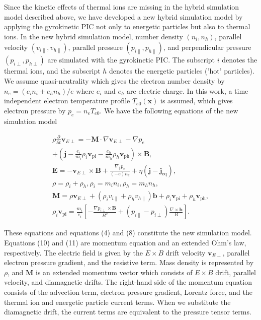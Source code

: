 \documentclass[10pt]{article}
\begin{document}
Since the kinetic effects of thermal ions are missing in the hybrid simulation model described above, we have developed a new hybrid simulation model by applying the gyrokinetic PIC not only to energetic particles but also to thermal ions. In the new hybrid simulation model, number density $\left(n_{i}, n_{h}\right)$, parallel velocity $\left(v_{i \|}, v_{h \|}\right)$, parallel pressure $\left(p_{i \|}, p_{h \|}\right)$, and perpendicular pressure $\left(p_{i \perp}, p_{h \perp}\right)$ are simulated with the gyrokinetic PIC. The subscript $i$ denotes the thermal ions, and the subscript $h$ denotes the energetic particles ('hot' particles). We assume quasi-neutrality which gives the electron number density by $n_{e}=\left(e_{i} n_{i}+e_{h} n_{h}\right) / e$ where $e_{i}$ and $e_{h}$ are electric charge. In this work, a time independent electron temperature profile $T_{e 0}(\mathbf{x})$ is assumed, which gives electron pressure by $p_{e}=n_{e} T_{e 0}$. We have the following equations of the new simulation model

$$
\begin{array}{r}
\rho \frac{\partial}{\partial t} \mathbf{v}_{E \perp}=-\mathbf{M} \cdot \nabla \mathbf{v}_{E \perp}-\nabla p_{e} \\
+\left(\mathbf{j}-\frac{e_{i}}{m_{i}} \rho_{i} \mathbf{v}_{\mathrm{pi}}-\frac{e_{h}}{m_{h}} \rho_{h} \mathbf{v}_{\mathrm{ph}}\right) \times \mathbf{B}, \\
\mathbf{E}=-\mathbf{v}_{E \perp} \times \mathbf{B}+\frac{\nabla_{\|} p_{e}}{(-e) n_{e}}+\eta\left(\mathbf{j}-\mathbf{j}_{\mathrm{eq}}\right), \\
\rho=\rho_{i}+\rho_{h}, \rho_{i}=m_{i} n_{i}, \rho_{h}=m_{h} n_{h}, \\
\mathbf{M}=\rho \mathbf{v}_{E \perp}+\left(\rho_{i} v_{i \|}+\rho_{h} v_{h \|}\right) \mathbf{b}+\rho_{i} \mathbf{v}_{\mathrm{pi}}+\rho_{h} \mathbf{v}_{\mathrm{ph}}, \\
\rho_{i} \mathbf{v}_{\mathrm{pi}}=\frac{m_{i}}{e_{i}}\left[-\frac{\nabla p_{i \perp} \times \mathbf{B}}{B^{2}}+\left(p_{i \|}-p_{i \perp}\right) \frac{\nabla \times \mathbf{b}}{B}\right] .
\end{array}
$$

These equations and equations (4) and (8) constitute the new simulation model. Equations (10) and (11) are momentum equation and an extended Ohm's law, respectively. The electric field is given by the $E \times B$ drift velocity $\mathbf{v}_{E \perp}$, parallel electron pressure gradient, and the resistive term. Mass density is represented by $\rho$, and $\mathbf{M}$ is an extended momentum vector which consists of $E \times B$ drift, parallel velocity, and diamagnetic drifts. The right-hand side of the momentum equation consists of the advection term, electron pressure gradient, Lorentz force, and the thermal ion and energetic particle current terms. When we substitute the diamagnetic drift, the current terms are equivalent to the pressure tensor terms.
\end{document}
